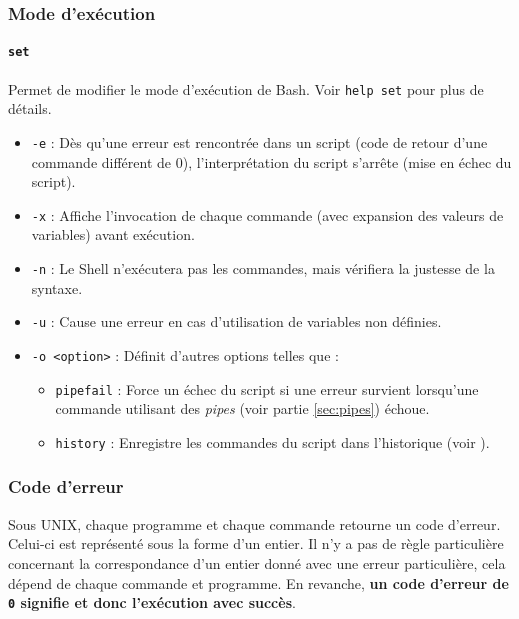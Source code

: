 \vspace{-5mm}
\subsubsection{Mode d'exécution} \label{sec:set}

\paragraph{\texttt{set}}  
Permet de modifier le mode d'exécution de Bash. Voir \texttt{help set} pour plus de détails.
\begin{itemize}
    \item \texttt{-e} : Dès qu'une erreur est rencontrée dans un script (code de retour d'une commande différent de 0), l'interprétation du script s'arrête (mise en échec du script).
    \item \texttt{-x} : Affiche l'invocation de chaque commande (avec expansion des valeurs de variables) avant exécution.
    \item \texttt{-n} : Le Shell n'exécutera pas les commandes, mais vérifiera la justesse de la syntaxe.
    \item \texttt{-u} : Cause une erreur en cas d'utilisation de variables non définies.
    \item \texttt{-o <option>} : Définit d'autres options telles que :
    \begin{itemize}
        \item \texttt{pipefail} : Force un échec du script si une erreur survient lorsqu'une commande utilisant des \textit{pipes} (voir partie \ref{sec:pipes}) échoue.
        \item \texttt{history} : Enregistre les commandes du script dans l'historique (voir ).
    \end{itemize}
\end{itemize}

\subsubsection{Code d'erreur} \label{sec:error}
Sous UNIX, chaque programme et chaque commande retourne un code d'erreur. Celui-ci est représenté sous la forme d'un entier. Il n'y a pas de règle particulière concernant la correspondance d'un entier donné avec une erreur particulière, cela dépend de chaque commande et programme. En revanche, \textbf{un code d'erreur de \texttt{0} signifie  et donc l'exécution avec succès}.


